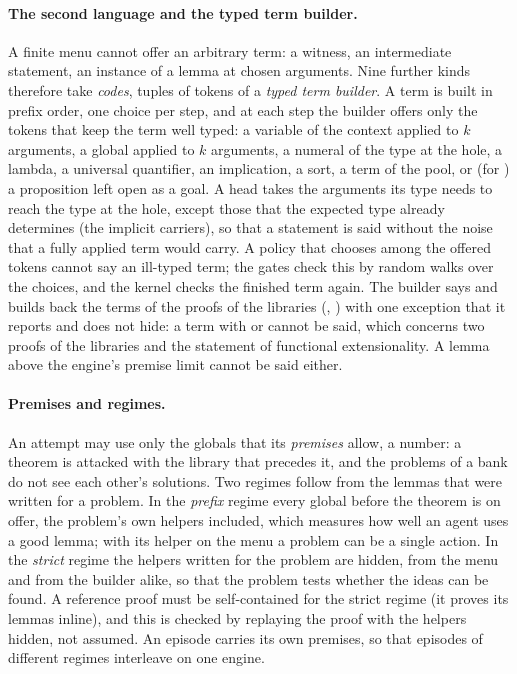\paragraph{The second language and the typed term builder.}
A finite menu cannot offer an arbitrary term: a witness, an intermediate statement, an instance of a lemma at chosen arguments.
Nine further kinds therefore take \emph{codes}, tuples of tokens of a \emph{typed term builder}.
A term is built in prefix order, one choice per step, and at each step the builder offers only the tokens that keep the term well typed: a variable of the context applied to $k$ arguments, a global applied to $k$ arguments, a numeral of the type at the hole, a lambda, a universal quantifier, an implication, a sort, a term of the pool, or (for ) a proposition left open as a goal.
A head takes the arguments its type needs to reach the type at the hole, except those that the expected type already determines (the implicit carriers), so that a statement is said without the noise that a fully applied term would carry.
A policy that chooses among the offered tokens cannot say an ill-typed term; the gates check this by random walks over the choices, and the kernel checks the finished term again.
The builder says and builds back the terms of the proofs of the libraries (, ) with one exception that it reports and does not hide: a term with  or  cannot be said, which concerns two proofs of the libraries and the statement of functional extensionality.
A lemma above the engine's premise limit cannot be said either.

\paragraph{Premises and regimes.}
An attempt may use only the globals that its \emph{premises} allow, a number: a theorem is attacked with the library that precedes it, and the problems of a bank do not see each other's solutions.
Two regimes follow from the lemmas that were written for a problem.
In the \emph{prefix} regime every global before the theorem is on offer, the problem's own helpers included, which measures how well an agent uses a good lemma; with its helper on the menu a problem can be a single action.
In the \emph{strict} regime the helpers written for the problem are hidden, from the menu and from the builder alike, so that the problem tests whether the ideas can be found.
A reference proof must be self-contained for the strict regime (it proves its lemmas inline), and this is checked by replaying the proof with the helpers hidden, not assumed.
An episode carries its own premises, so that episodes of different regimes interleave on one engine.

